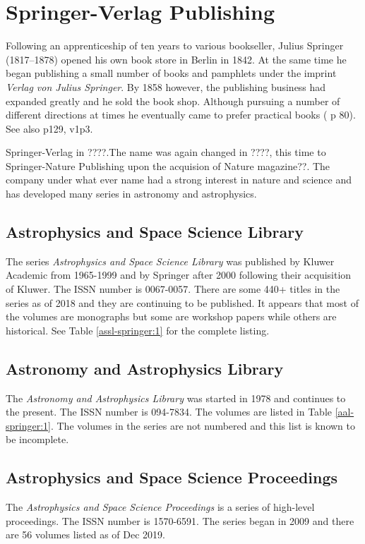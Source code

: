 \section{Springer-Verlag Publishing}

Following an apprenticeship of ten years to various bookseller, Julius
Springer (1817--1878) opened his own book store in Berlin in 1842. At
the same time he began publishing a small number of books and pamphlets
under the imprint {\itshape Verlag von Julius Springer}.  By 1858 however,
the publishing business had expanded greatly and he sold the book
shop. Although pursuing a number of different directions at times he
eventually came to prefer practical books (\cite{Sarkowski1996} p 80).
See also p129, v1p3.

Springer-Verlag in ????.The name was again changed in ????, this time
to Springer-Nature Publishing upon the acquision of Nature magazine??.
The company under what ever name had a strong interest in nature and
science and has developed many series in astronomy and astrophysics.

\subsection{Astrophysics and Space Science Library}

The series {\itshape Astrophysics and Space Science Library} was published
by Kluwer Academic from 1965-1999 and by Springer after 2000 following
their acquisition of Kluwer.  The ISSN number is 0067-0057. There are
some 440+ titles in the series as of 2018 and they are continuing to
be published.  It appears that most of the volumes are monographs but
some are workshop papers while others are historical. See Table
\ref{assl-springer:1} for the complete listing.

\subsection{Astronomy and Astrophysics Library}
  
The {\itshape Astronomy and Astrophysics Library} was started in 1978 and
continues to the present. The ISSN number is 094-7834. The volumes are
listed in Table \ref{aal-springer:1}.  The volumes in the series are
not numbered and this list is known to be incomplete.

\subsection{Astrophysics and Space Science Proceedings}

The {\itshape Astrophysics and Space Science Proceedings} is a series
of high-level proceedings.  The ISSN number is 1570-6591.  The series
began in 2009 and there are 56 volumes listed as of Dec 2019.
